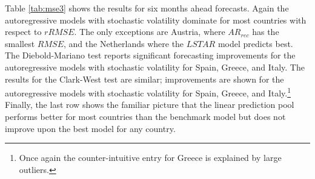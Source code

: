 \documentclass[12pt,letterpaper,fleqn]{article}           %
\begin{document}
Table \ref{tab:mse3} shows the results for six months ahead forecasts. Again the autoregressive models with stochastic volatility dominate for most countries with respect to $rRMSE$. The only exceptions are Austria, where $AR_{rec}$ has the smallest $RMSE$, and the Netherlands where the $LSTAR$ model predicts best. The Diebold-Mariano test reports significant forecasting improvements for the autoregressive models with stochastic volatility for Spain, Greece, and Italy. The results for the Clark-West test are similar; improvements are shown for the autoregressive models with stochastic volatility for Spain, Greece, and Italy.\footnote{Once again the counter-intuitive entry for Greece is explained by large outliers.} Finally, the last row shows the familiar picture that the linear prediction pool performs better for most countries than the benchmark model but does not improve upon the best model for any country.
\end{document}
